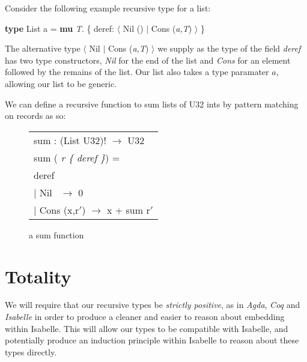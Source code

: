 Consider the following example recursive type for a list:
\begin{center}
    \textbf{type} List a = \textbf{mu} \textit{T}. \{ deref: $\langle$ Nil () $\vert$ Cons (\textit{a,T}) $\rangle$ \}
\end{center}

The alternative type {$\langle$ Nil $\vert$ Cons (\textit{a,T}) $\rangle$} we supply as the type of the field
\textit{deref} has two type constructors, \textit{Nil} for the end of the list and \textit{Cons} for an element
followed by the remains of the list. Our list also takes a type paramater $a$, allowing our list to be generic.

We can define a recursive function to sum lists of U32 ints by pattern matching on records as so:
\begin{figure}[!htbp]
    \begin{center}
        \begin{tabular}{l}
            sum : (List U32)! $\rightarrow$ U32 \\
            sum (\textit{ r \{ deref \}}) = \\
            \hspace{0.8em} deref \\
                \hspace{2em} $\vert$ Nil  \quad\quad\quad$\,$   $\rightarrow$ 0 \\
                \hspace{2em} $\vert$ Cons (x,r$'$)  $\rightarrow$ x + sum r$'$
        \end{tabular}
    \end{center}
    \caption[short]{a sum function}
    \label{fig:sum}
\end{figure}



\section{Totality}

We will require that our recursive types be \textit{strictly positive}, as in \textit{Agda},
\textit{Coq} and \textit{Isabelle} in order to produce a cleaner and easier to reason about
embedding within Isabelle. This will allow our types to be compatible with Isabelle, and potentially
produce an induction principle within Isabelle to reason about these types directly.

